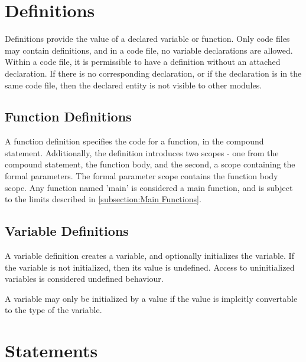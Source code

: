 \documentclass[letterpaper,12pt]{book}
\begin{document}
\chapter{Definitions}



Definitions provide the value of a declared variable or function. Only code files may contain definitions, and in a code file, no variable declarations are allowed. Within a code file, it is permissible to have a definition without an attached declaration. If there is no corresponding declaration, or if the declaration is in the same code file, then the declared entity is not visible to other modules.

\section{Function Definitions}



A function definition specifies the code for a function, in the compound statement. Additionally, the definition introduces two scopes - one from the compound statement, the function body, and the second, a scope containing the formal parameters. The formal parameter scope contains the function body scope. Any function named 'main' is considered a main function, and is subject to the limits described in \ref{subsection:Main Functions}.

\section{Variable Definitions}



A variable definition creates a variable, and optionally initializes the variable. If the variable is not initialized, then its value is undefined. Access to uninitialized variables is considered undefined behaviour.

A variable may only be initialized by a value if the value is implcitly convertable to the type of the variable.

\chapter{Statements}
\end{document}
